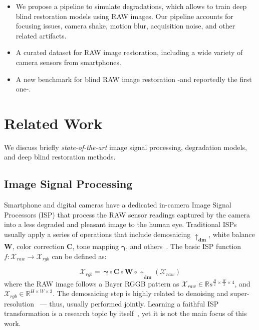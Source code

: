 \documentclass{article}
\begin{document}
\begin{itemize}
  \itemsep0em 
  \item[1)] We propose a pipeline to simulate degradations, which allows to train deep blind restoration models using RAW images. Our pipeline accounts for focusing issues, camera shake, motion blur, acquisition noise, and other related artifacts.
  \item[2)] A curated dataset for RAW image restoration, including a wide variety of camera sensors from smartphones. 
  \item[3)] A new benchmark for blind RAW image restoration -and reportedly the first one-. 
\end{itemize}


\section{Related Work}
\label{sec:related_work}

We discuss briefly \emph{state-of-the-art} image signal processing, degradation models, and deep blind restoration methods.

\subsection{Image Signal Processing}
\label{ssc:isp}

Smartphone and digital cameras have a dedicated in-camera Image Signal Processors (ISP) that process the RAW sensor readings captured by the camera into a less degraded and pleasant image to the human eye. 
%
Traditional ISPs usually apply a series of operations that include demosaicing $\uparrow_{\mathbf{dm}}$, white balance $\mathbf{W}$, color correction $\mathbf{C}$, tone mapping $\mathbf{\gamma}$, and others~\cite{karaimer2016software, delbracio2021mobile, conde2022modelbased}. The basic ISP function $f: \mathcal{X}_{raw} \rightarrow \mathcal{X}_{rgb}$ can be defined as:

\begin{equation}
\mathcal{X}_{rgb}\!= ~{\mathbf{\gamma}} \circ {\mathbf{C}} \circ {\mathbf{W}} \circ \uparrow_{\mathbf{dm}} \!(\mathcal{X}_{raw})
\label{eq:isp}
\end{equation}
where the RAW image follows a Bayer RGGB pattern as $\mathcal{X}_{raw} \in \mathbb{R}s^{\frac{H}{2} \times \frac{W}{2} \times 4}$, and $\mathcal{X}_{rgb} \in \mathbb{R}^{H \times W \times 3}$. The demosaicing step is highly related to denoising and super-resolution~\cite{qian2019trinity} --- thus, usually performed jointly.
%
Learning a faithful ISP transformation is a research topic by itself~\cite{schwartz2018deepisp,zhang2019zoom}, yet it is not the main focus of this work. %
\end{document}
